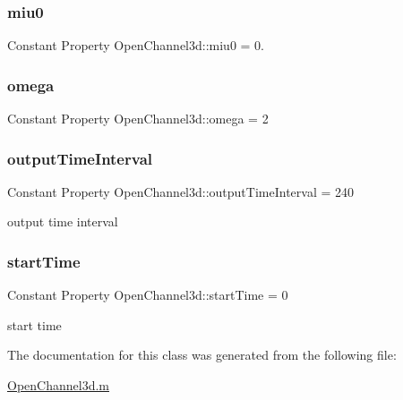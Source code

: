 \subsubsection{\texorpdfstring{miu0}{miu0}}
{\footnotesize\ttfamily Constant Property Open\+Channel3d\+::miu0 = 0.}

\mbox{\label{class_open_channel3d_ae068e1b972f9f51e49767bb23d166804}} 
\subsubsection{\texorpdfstring{omega}{omega}}
{\footnotesize\ttfamily Constant Property Open\+Channel3d\+::omega = 2}

\mbox{\label{class_open_channel3d_ac61988aca3f0fd6165fa22be5ca52ab9}} 
\subsubsection{\texorpdfstring{output\+Time\+Interval}{outputTimeInterval}}
{\footnotesize\ttfamily Constant Property Open\+Channel3d\+::output\+Time\+Interval = 240}



output time interval 

\mbox{\label{class_open_channel3d_a6fed2187810c042b20d1830cced71668}} 
\subsubsection{\texorpdfstring{start\+Time}{startTime}}
{\footnotesize\ttfamily Constant Property Open\+Channel3d\+::start\+Time = 0}



start time 



The documentation for this class was generated from the following file\+:\begin{DoxyCompactItemize}
\item 
\hyperlink{_open_channel3d_8m}{Open\+Channel3d.\+m}\end{DoxyCompactItemize}
